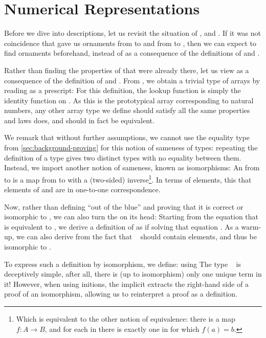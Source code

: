 \section{Numerical Representations}\label{sec:background-numerical}
Before we dive into descriptions, let us revisit the situation of \bN{},  and . If it was not coincidence that gave us ornaments from \bN{} to  and from  to , then we can expect to find ornaments beforehand, instead of as a consequence of the definitions of  and .

Rather than finding the properties of  that were already there, let us view  as a consequence of the definition of \bN{} and . From \bN{}, we obtain a trivial type of arrays by reading  as a prescript:
For this definition, the lookup function is simply the identity function on . As this is the prototypical array corresponding to natural numbers, any other array type we define should satisfy all the same properties and laws  does, and should in fact be equivalent.


We remark that without further assumptions, we cannot use the equality type from \autoref{sec:background-proving} for this notion of sameness of types: repeating the definition of a type gives two distinct types with no equality between them. Instead, we import another notion of sameness, known as isomorphisms:
An  from  to  is a map from  to  with a (two-sided) inverse\footnote{Which is equivalent to the other notion of equivalence: there is a map $f : A \to B$, and for each  in  there is exactly one  in  for which $f(a) = b$.}. In terms of elements, this that elements of  and  are in one-to-one correspondence.

Now, rather than defining  ``out of the blue'' and proving that it is correct or isomorphic to , we can also turn the  on its head: Starting from the equation that  is equivalent to , we derive a definition of  as if solving that equation \cite{calcdata}. As a warm-up, we can also derive  from the fact that \  should contain  elements, and thus be isomorphic to .

To express such a definition by isomorphism, we define:
using
The type \  is deceptively simple, after all, there is (up to isomorphism) only one unique term in it! However, when using initions, the implicit  extracts the right-hand side of a proof of an isomorphism, allowing us to reinterpret a proof as a definition.

